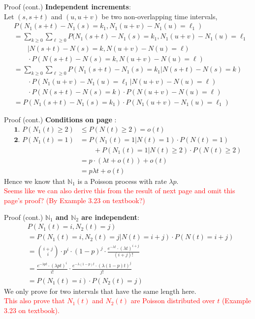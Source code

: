 \documentclass[mathserif]{beamer}
\begin{document}
\begin{frame}{Proof (cont.)}
\textbf{Independent increments}:\\
Let $(s,s+t)$ and $(u,u+v)$ be two non-overlapping time intervals,
\begin{align*}
& P(N_1(s+t)-N_1(s)=k_1, N_1(u+v)-N_1(u)=\ell_1) \\
& = \sum_{k\geq 0}\sum_{\ell\geq 0} P(N_1(s+t)-N_1(s)=k_1, N_1(u+v)-N_1(u)=\ell_1 \\
& \qquad | N(s+t)-N(s)=k, N(u+v)-N(u)=\ell) \\
& \qquad \cdot P(N(s+t)-N(s)=k, N(u+v)-N(u)=\ell) \\
& = \sum_{k\geq 0}\sum_{\ell\geq 0} P(N_1(s+t)-N_1(s)=k_1 | N(s+t)-N(s)=k) \\
& \qquad\cdot P(N_1(u+v)-N_1(u)=\ell_1 | N(u+v)-N(u)=\ell) \\
& \qquad\cdot P(N(s+t)-N(s)=k)\cdot P(N(u+v)-N(u)=\ell) \\
& = P(N_1(s+t)-N_1(s)=k_1)\cdot P(N_1(u+v)-N_1(u)=\ell_1)
\end{align*}
\end{frame}

\begin{frame}{Proof (cont.)}
\textbf{Conditions on page \pageref{operation_def}}:
\begin{align*}
\textbf{1. } P(N_1(t)\geq 2) & \leq P(N(t)\geq 2) = o(t) \\
\textbf{2. } P(N_1(t)=1) & = P(N_1(t)=1 | N(t)=1)\cdot P(N(t)=1) \\
& \qquad + P(N_1(t)=1 | N(t)\geq 2)\cdot P(N(t)\geq 2) \\
& = p\cdot (\lambda t + o(t)) + o(t) \\
& = p\lambda t + o(t)
\end{align*}
Hence we know that $\mathbb{N}_1$ is a Poisson process with rate $\lambda p$.\\
\textcolor{red}{Seems like we can also derive this from the result of next page and omit this page's proof? (By Example 3.23 on textbook?)}
\end{frame}

\begin{frame}{Proof (cont.)}
\textbf{$\mathbb{N}_1$ and $\mathbb{N}_2$ are independent}:
\begin{align*}
& P(N_1(t) = i, N_2(t) = j) \\
& = P(N_1(t) = i, N_2(t) = j | N(t) = i+j)\cdot P(N(t) = i+j) \\
& = \binom{i+j}{i}\cdot p^i\cdot (1-p)^j\cdot \frac{e^{-\lambda t}\cdot (\lambda t)^{i+j}}{(i+j)!} \\
& = \frac{e^{-\lambda pt}\cdot (\lambda pt)^i}{i!}\cdot \frac{e^{-\lambda (1-p)t}\cdot (\lambda (1-p)t)^j}{j!} \\
& = P(N_1(t)=i)\cdot P(N_2(t)=j)
\end{align*}
We only prove for two intervals that have the same length here.\\
\textcolor{red}{This also prove that $N_1(t)$ and $N_2(t)$ are Poisson distributed over $t$ (Example 3.23 on textbook).}
\end{frame}
\end{document}
